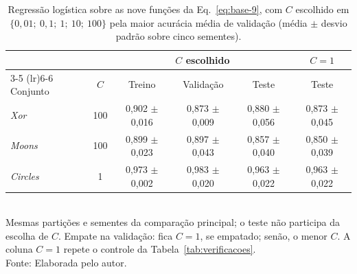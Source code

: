 \begin{table}[htb]
\centering
\small
\caption[Controle linear com regularização escolhida pela validação]{Regressão logística sobre as nove funções da Eq.~\eqref{eq:base-9}, com $C$ escolhido em $\{0{,}01;\ 0{,}1;\ 1;\ 10;\ 100\}$ pela maior acurácia média de validação (média $\pm$ desvio padrão sobre cinco sementes).}
\label{tab:controle-linear-C}
\begin{tabular}{lccccc}
\toprule
 & & \multicolumn{3}{c}{$C$ escolhido} & $C = 1$ \\
\cmidrule(lr){3-5} \cmidrule(lr){6-6}
Conjunto & $C$ & Treino & Validação & Teste & Teste \\
\midrule
\textit{Xor} & 100 & 0,902 $\pm$ 0,016 & 0,873 $\pm$ 0,009 & 0,880 $\pm$ 0,056 & 0,873 $\pm$ 0,045 \\
\textit{Moons} & 100 & 0,899 $\pm$ 0,023 & 0,897 $\pm$ 0,043 & 0,857 $\pm$ 0,040 & 0,850 $\pm$ 0,039 \\
\textit{Circles} & 1 & 0,973 $\pm$ 0,002 & 0,983 $\pm$ 0,020 & 0,963 $\pm$ 0,022 & 0,963 $\pm$ 0,022 \\
\bottomrule
\end{tabular}
\\[2pt]
{\footnotesize Mesmas partições e sementes da comparação principal; o teste não participa da escolha de $C$. Empate na validação: fica $C = 1$, se empatado; senão, o menor $C$. A coluna $C = 1$ repete o controle da Tabela~\ref{tab:verificacoes}.}
\\[2pt]
{\footnotesize Fonte: Elaborada pelo autor.}
\end{table}
